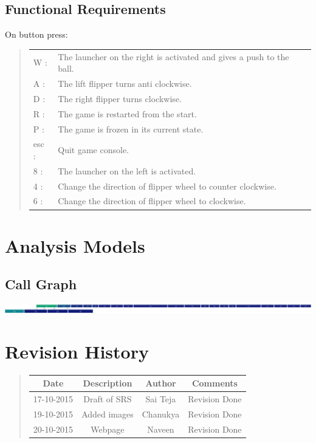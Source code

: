 \documentclass{article}
\begin{document}
    \subsection{Functional Requirements}
    On button press:\\
    \begin{quote}
    \begin{tabular}{ll}
        W   :&The launcher on the right is activated and gives a push to the ball.\\
        A   :&The lift flipper turns anti clockwise.\\
        D   :&The right flipper turns clockwise.\\
        R   :&The game is restarted from the start.\\
        P   :&The game is frozen in its current state.\\
        esc :&Quit game console.\\
        8   :&The launcher on the left is activated.\\
        4   :&Change the direction of flipper wheel to counter clockwise.\\
        6   :&Change the direction of flipper wheel to clockwise.
    \end{tabular}
    \end{quote}

    \section{Analysis Models}
    \subsection{Call Graph}

    \begin{minipage}[h]{0.25\textwidth}
        \vspace{0pt}
        \centering
        \includegraphics[width=6.5in,natwidth=610,natheight=642]{analysis.png}
        \label{fig:Pinball}
    \end{minipage}

    \section{Revision History}
    \begin{quote}
        \begin{tabular}{ |c|c|c|c| }
         \hline
         \textbf{Date}&\textbf{Description}&\textbf{Author}&\textbf{Comments}\\
         \hline 
          17-10-2015& Draft of SRS & Sai Teja & Revision Done\\
         \hline 
          19-10-2015& Added images & Chanukya & Revision Done\\
         \hline 
          20-10-2015& Webpage & Naveen & Revision Done\\
         \hline
        \end{tabular}
    \end{quote}
\end{document}
